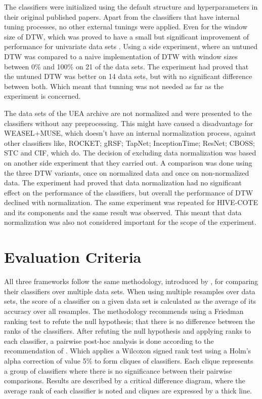 The classifiers were initialized using the default structure and hyperparameters in their original published papers.
Apart from the classifiers that have internal tuning processes, no other external tunings were applied.
Even for the window size of DTW, which was proved to have a small but significant improvement of performance for univariate data sets \cite{ratanamahatana2005three}.
Using a side experiment, where an untuned DTW was compared to a naive implementation of DTW with window sizes between 0\% and 100\% on 21 of the data sets.
The experiment had proved that the untuned DTW was better on 14 data sets, but with no significant difference between both.
Which meant that tunning was not needed as far as the experiment is concerned.

The data sets of the UEA archive are not normalized and were presented to the classifiers without any preprocessing.
This might have caused a disadvantage for WEASEL+MUSE, which doesn't have an internal normalization process, against other classifiers like,
ROCKET; gRSF; TapNet; InceptionTime; ResNet; CBOSS; STC and CIF, which do.
The decision of excluding data normalization was based on another side experiment that they carried out.
A comparison was done using the three DTW variants, once on normalized data and once on non-normalized data.
The experiment had proved that data normalization had no significant effect on the performance of the classifiers, but overall the performance of DTW declined with normalization.
The same experiment was repeated for HIVE-COTE and its components and the same result was observed.
This meant that data normalization was also not considered important for the scope of the experiment.

\section{Evaluation Criteria}
\label{ReviewsEvaluation}
All three frameworks follow the same methodology, introduced by \cite{demvsar2006statistical}, for comparing their classifiers over multiple data sets.
When using multiple resamples over data sets, the score of a classifier on a given data set is calculated as the average of its accuracy over all resamples.
The methodology recommends using a Friedman ranking test to refute the null hypothesis; that there is no difference between the ranks of the classifiers.
After refuting the null hypothesis and applying ranks to each classifier, a pairwise post-hoc analysis is done according to the recommendation of \cite{benavoli2016should}.
Which applies a Wilcoxon signed rank test using a Holm's alpha correction of value 5\% to form cliques of classifiers.
Each clique represents a group of classifiers where there is no significance between their pairwise comparisons.
Results are described by a critical difference diagram, where the average rank of each classifier is noted and cliques are expressed by a thick line.